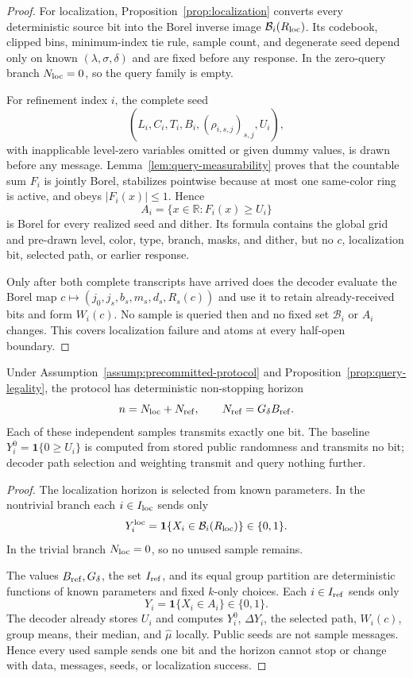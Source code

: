 \begin{proof}
For localization, Proposition~\ref{prop:localization} converts every
deterministic source bit into the Borel inverse image
$\mathcal B_i(R_{\rm loc})$.  Its codebook, clipped bins, minimum-index tie
rule, sample count, and degenerate seed depend only on known
$(\lambda,\sigma,\delta)$ and are fixed before any response.  In the
zero-query branch $N_{\rm loc}=0$, so the query family is empty.

For refinement index $i$, the complete seed
\[
 (L_i,C_i,T_i,B_i,(\rho_{i,s,j})_{s,j},U_i),
\]
with inapplicable level-zero variables omitted or given dummy values, is
drawn before any message.  Lemma~\ref{lem:query-measurability} proves that
the countable sum $F_i$ is jointly Borel, stabilizes pointwise because at
most one same-color ring is active, and obeys $|F_i(x)|\leq1$.  Hence
\[
 A_i=\{x\in\mathbb R:F_i(x)\geq U_i\}
\]
is Borel for every realized seed and dither.  Its formula contains the
global grid and pre-drawn level, color, type, branch, masks, and dither, but
no $c$, localization bit, selected path, or earlier response.

Only after both complete transcripts have arrived does the decoder evaluate
the Borel map $c\mapsto(j_0,j_s,b_s,m_s,d_s,R_s(c))$ and use it to retain
already-received bits and form $W_i(c)$.  No sample is queried then and no
fixed set $\mathcal B_i$ or $A_i$ changes.  This covers localization failure
and atoms at every half-open boundary.
\end{proof}

\begin{proposition}
\label{prop:one-bit-accounting}
Under Assumption~\ref{assump:precommitted-protocol} and
Proposition~\ref{prop:query-legality}, the protocol has deterministic
non-stopping horizon
\[
 n=N_{\rm loc}+N_{\rm ref},
 \qquad N_{\rm ref}=G_\delta B_{\rm ref}.
\]
Each of these independent samples transmits exactly one bit.  The baseline
$Y_i^0=\mathbf1\{0\geq U_i\}$ is computed from stored public randomness
and transmits no bit; decoder path selection and weighting transmit and query
nothing further.
\end{proposition}

\begin{proof}
The localization horizon is selected from known parameters.  In the
nontrivial branch each $i\in I_{\rm loc}$ sends only
\[
 Y_i^{\rm loc}=\mathbf1\{X_i\in\mathcal B_i(R_{\rm loc})\}\in\{0,1\}.
\]
In the trivial branch $N_{\rm loc}=0$, so no unused sample remains.

The values $B_{\rm ref},G_\delta$, the set $I_{\rm ref}$, and its equal
group partition are deterministic functions of known parameters and fixed
$k$-only choices.  Each $i\in I_{\rm ref}$ sends only
\[
 Y_i=\mathbf1\{X_i\in A_i\}\in\{0,1\}.
\]
The decoder already stores $U_i$ and computes $Y_i^0$, $\Delta Y_i$, the
selected path, $W_i(c)$, group means, their median, and $\widehat\mu$
locally.  Public seeds are not sample messages.  Hence every used sample
sends one bit and the horizon cannot stop or change with data, messages,
seeds, or localization success.
\end{proof}

